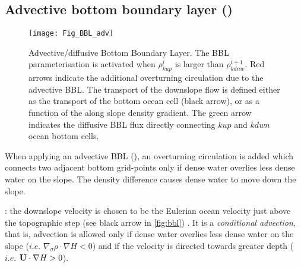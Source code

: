 \documentclass[../main/NEMO_manual]{subfiles}
\begin{document}
\subsection{Advective bottom boundary layer  (\protect{})}
\label{subsec:TRA_bbl_adv}


\begin{figure}[!t]
  \begin{center}
    \texttt{[image: Fig\_BBL\_adv]}
    \caption{
      \protect\label{fig:bbl}
      Advective/diffusive Bottom Boundary Layer.
      The BBL parameterisation is activated when $\rho^i_{kup}$ is larger than $\rho^{i+1}_{kdnw}$.
      Red arrows indicate the additional overturning circulation due to the advective BBL.
      The transport of the downslope flow is defined either as the transport of the bottom ocean cell (black arrow),
      or as a function of the along slope density gradient.
      The green arrow indicates the diffusive BBL flux directly connecting $kup$ and $kdwn$ ocean bottom cells.
    }
  \end{center}
\end{figure}




When applying an advective BBL (), an overturning circulation is added which
connects two adjacent bottom grid-points only if dense water overlies less dense water on the slope.
The density difference causes dense water to move down the slope. 

:
the downslope velocity is chosen to be the Eulerian ocean velocity just above the topographic step
(see black arrow in \autoref{fig:bbl}) \citep{Beckmann_Doscher1997}.
It is a \textit{conditional advection}, that is, advection is allowed only
if dense water overlies less dense water on the slope ($i.e.$ $\nabla_\sigma \rho  \cdot  \nabla H<0$) and
if the velocity is directed towards greater depth ($i.e.$ $\mathbf{U}  \cdot  \nabla H>0$).
\end{document}
